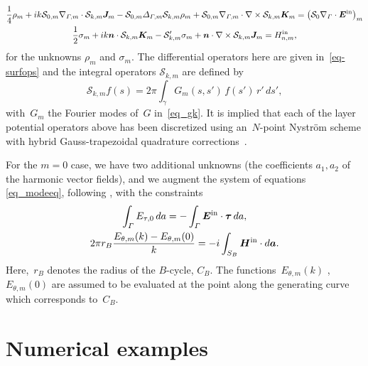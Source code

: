 \documentclass[11pt]{article}
\newcommand{\vct}{\vectorsym}
\newcommand{\surfdiv}{\nabla_\Gamma \cdot}
\newcommand{\bn}{\vct{ n}}
\newcommand{\bJ}{\vct{ J}}
\newcommand{\bK}{\vct{ K}}
\newcommand{\cS}{\mathcal S}
\newcommand\btau{\vct{\tau}}
\newcommand\ba{\vct{a}}
\newcommand\bEin{\vct{E}^\textnormal{in}}
\newcommand\bHin{\vct{H}^\textnormal{in}}
\newcommand\Ein{E^\textnormal{in}}
\newcommand\Hin{H^\textnormal{in}}
\numberwithin{equation}{section}
\begin{document}
\begin{equation}\label{eq_modeeq}
  \begin{gathered}
 \frac{1}{4} \rho_m + ik\cS_{0,m} \nabla_{\Gamma,m}\cdot \cS_{k,m}
  \bJ_m - \cS_{0,m} \Delta_{\Gamma,m} \cS_{k,m} \rho_m +
  \cS_{0,m} \nabla_{\Gamma,m}\cdot \nabla
  \times \cS_{k,m} \bK_m =  \left( \cS_0 \surfdiv \bEin
\right)_m \\
\frac{1}{2} \sigma_m + ik \bn \cdot \cS_{k,m} \bK_m - \cS'_{k,m} \sigma_m +
\bn \cdot \nabla \times \cS_{k,m} \bJ_m = \Hin_{n,m},
\end{gathered}
\end{equation}
for the unknowns $\rho_m$ and $\sigma_m$.
The differential operators here are given 
in~\eqref{eq-surfops} and the integral operators $\cS_{k,m}$ are defined by
\begin{equation}
  \cS_{k,m}f(s) = 2\pi \int_\gamma G_m(s,s') \, f(s') \, r' \, ds',
\end{equation}
with~$G_m$ the Fourier modes of~$G$ in~\eqref{eq_gk}. It is implied
that each of the layer potential 
operators above has been discretized using
an~$N$-point Nystr\"om scheme with hybrid Gauss-trapezoidal quadrature
corrections~\cite{alpert}.

For the $m=0$ case, we have two additional unknowns (the coefficients $a_1,a_2$ of the
harmonic vector fields), and we augment the system of equations \eqref{eq_modeeq}, 
following \cite{EpGrOn}, with the constraints
\begin{equation}\label{eq_modeeq0}
  \begin{gathered}
\int_\Gamma E_{\tau,0} \, da = - \int_\Gamma \bEin \cdot \btau \, da, \\
2\pi r_B  \frac{E_{\theta,m}(k) - E_{\theta,m}(0) }{k}  = 
    -i \int_{S_B} \bHin \cdot d\ba.
\end{gathered}
\end{equation}
Here,~$r_B$ denotes the radius of the $B$-cycle, $C_B$. The
functions~$E_{\theta,m}(k)$ ,$E_{\theta,m}(0)$ are assumed to be
evaluated at the point along the generating curve which corresponds
to~$C_B$.




\section{Numerical examples}
\label{sec_examples}
\end{document}
